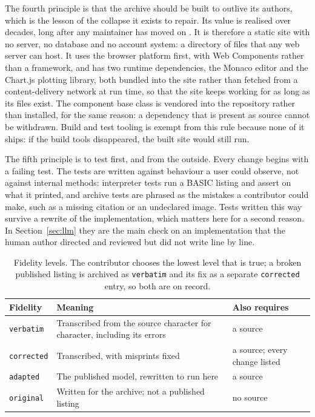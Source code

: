 The fourth principle is that the archive should be built to outlive its authors, which is the lesson of the collapse it exists to repair. Its value is realised over decades, long after any maintainer has moved on \citep{hinsen2019}. It is therefore a static site with no server, no database and no account system: a directory of files that any web server can host. It uses the browser platform first, with Web Components rather than a framework, and has two runtime dependencies, the Monaco editor and the Chart.js plotting library, both bundled into the site rather than fetched from a content-delivery network at run time, so that the site keeps working for as long as its files exist. The component base class is vendored into the repository rather than installed, for the same reason: a dependency that is present as source cannot be withdrawn. Build and test tooling is exempt from this rule because none of it ships: if the build tools disappeared, the built site would still run.

The fifth principle is to test first, and from the outside. Every change begins with a failing test. The tests are written against behaviour a user could observe, not against internal methods: interpreter tests run a BASIC listing and assert on what it printed, and archive tests are phrased as the mistakes a contributor could make, such as a missing citation or an undeclared image. Tests written this way survive a rewrite of the implementation, which matters here for a second reason. In Section~\ref{sec:llm} they are the main check on an implementation that the human author directed and reviewed but did not write line by line.

\begin{table}[h]
\centering\small
\begin{tabularx}{\linewidth}{@{}lXl@{}}
\toprule
Fidelity & Meaning & Also requires \\
\midrule
\texttt{verbatim} & Transcribed from the source character for character, including its errors & a source \\
\texttt{corrected} & Transcribed, with misprints fixed & a source; every change listed \\
\texttt{adapted} & The published model, rewritten to run here & a source \\
\texttt{original} & Written for the archive; not a published listing & no source \\
\bottomrule
\end{tabularx}
\caption{Fidelity levels. The contributor chooses the lowest level that is true; a broken published listing is archived as \texttt{verbatim} and its fix as a separate \texttt{corrected} entry, so both are on record.}
\label{tab:fidelity}
\end{table}


